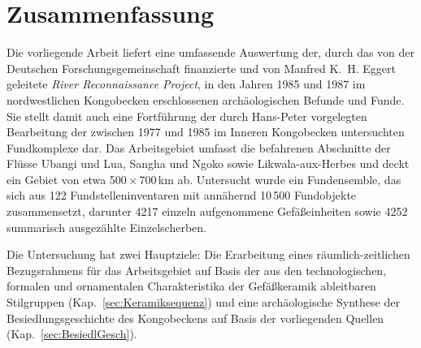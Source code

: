 \chapter{Zusammenfassung}\label{sec:Zusammenfassung}

Die vorliegende Arbeit liefert eine umfassende Auswertung der, durch das von der Deutschen Forschungsgemeinschaft finanzierte und von Manfred K.~H. Eggert geleitete \textit{River Reconnaissance Project}, in den Jahren 1985 und 1987 im nordwestlichen Kongobecken erschlossenen archäologischen Befunde und Funde. Sie stellt damit auch eine Fortführung der durch Hans-Peter \textcite{Wotzka.1995} vorgelegten Bearbeitung der zwischen 1977 und 1985 im Inneren Kongobecken untersuchten Fundkomplexe dar. Das Arbeitsgebiet umfasst die befahrenen Abschnitte der Flüsse Ubangi und Lua, Sangha und Ngoko sowie Likwala-aux-Herbes und deckt ein Gebiet von etwa 500\,$\times$\,700\,km ab. Untersucht wurde ein Fundensemble, das sich aus 122 Fundstelleninventaren mit annähernd 10\,500 Fundobjekte zusammensetzt, darunter 4217 einzeln aufgenommene Gefäßeinheiten sowie 4252 summarisch ausgezählte Einzelscherben.

Die Untersuchung hat zwei Hauptziele: Die Erarbeitung eines räumlich-zeitlichen Bezugsrahmens für das Arbeitsgebiet auf Basis der aus den technologischen, formalen und ornamentalen Charakteristika der Gefäßkeramik ableitbaren Stilgruppen (Kap.~\ref{sec:Keramiksequenz}) und eine archäologische Synthese der Besiedlungsgeschichte des Kongobeckens auf Basis der vorliegenden Quellen (Kap.~\ref{sec:BesiedlGesch}).

